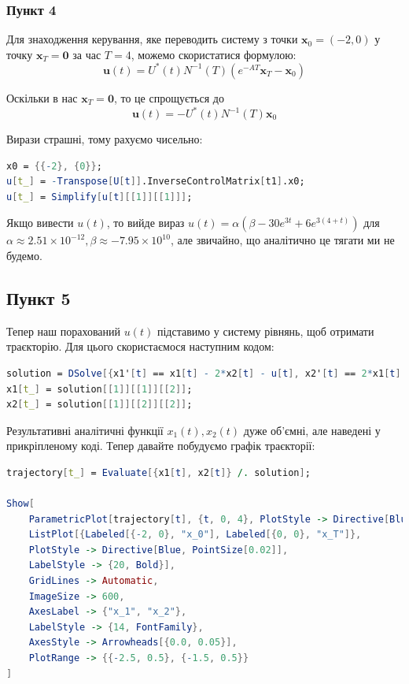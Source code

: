 \documentclass{hw_template}
\begin{document}
\subsubsection*{Пункт 4}

Для знаходження керування, яке переводить систему з точки $\mathbf{x}_0 = (-2,0)$ у точку $\mathbf{x}_T = \mathbf{0}$ за час $T=4$, можемо скористатися формулою:
\begin{equation*}
    \mathbf{u}(t) = U^*(t)N^{-1}(T)\left(e^{-AT}\mathbf{x}_T - \mathbf{x}_0\right)
\end{equation*}

Оскільки в нас $\mathbf{x}_T = \mathbf{0}$, то це спрощується до
\begin{equation*}
    \mathbf{u}(t) = -U^*(t)N^{-1}(T)\mathbf{x}_0
\end{equation*}

Вирази страшні, тому рахуємо чисельно:
\begin{lstlisting}[language=Mathematica]
x0 = {{-2}, {0}};
u[t_] = -Transpose[U[t]].InverseControlMatrix[t1].x0;
u[t_] = Simplify[u[t][[1]][[1]]];
\end{lstlisting}

Якщо вивести $u(t)$, то вийде вираз $u(t)=\alpha(\beta-30e^{3t}+6e^{3(4+t)})$ для $\alpha \approx 2.51 \times 10^{-12}, \beta \approx -7.95 \times 10^{10}$, але звичайно, що аналітично це тягати ми не будемо. 

\subsection*{Пункт 5}

Тепер наш порахований $u(t)$ підставимо у систему рівнянь, щоб отримати траєкторію. Для цього скористаємося наступним кодом:
\begin{lstlisting}[language=Mathematica]
solution = DSolve[{x1'[t] == x1[t] - 2*x2[t] - u[t], x2'[t] == 2*x1[t] - 4*x2[t] + 4*u[t], x1[0] == -2, x2[0] == 0}, {x1[t], x2[t]}, t];
x1[t_] = solution[[1]][[1]][[2]];
x2[t_] = solution[[1]][[2]][[2]];
\end{lstlisting}

Результативні аналітичні функції $x_1(t),x_2(t)$ дуже об'ємні, але наведені у прикріпленому коді. Тепер давайте побудуємо графік траєкторії:
\begin{lstlisting}[language=Mathematica]
trajectory[t_] = Evaluate[{x1[t], x2[t]} /. solution];

Show[
    ParametricPlot[trajectory[t], {t, 0, 4}, PlotStyle -> Directive[Blue, Thickness[0.005]]] /. Line[x_] :> {Arrowheads[{0., 0.05, 0.05, 0.05, 0.}], Arrow[x]}, 
    ListPlot[{Labeled[{-2, 0}, "x_0"], Labeled[{0, 0}, "x_T"]}, 
    PlotStyle -> Directive[Blue, PointSize[0.02]], 
    LabelStyle -> {20, Bold}],
    GridLines -> Automatic,
    ImageSize -> 600,
    AxesLabel -> {"x_1", "x_2"},
    LabelStyle -> {14, FontFamily},
    AxesStyle -> Arrowheads[{0.0, 0.05}],
    PlotRange -> {{-2.5, 0.5}, {-1.5, 0.5}}
]
\end{lstlisting}
\end{document}
